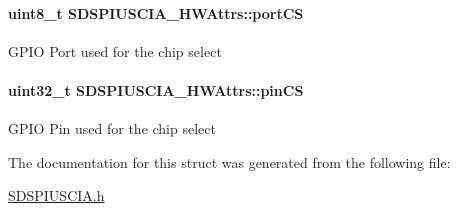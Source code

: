 \paragraph[{port\+C\+S}]{\setlength{\rightskip}{0pt plus 5cm}uint8\+\_\+t S\+D\+S\+P\+I\+U\+S\+C\+I\+A\+\_\+\+H\+W\+Attrs\+::port\+C\+S}\label{struct_s_d_s_p_i_u_s_c_i_a___h_w_attrs_aa10da6b5705fa5bdb6087a7f44374ea1}
G\+P\+I\+O Port used for the chip select 
\paragraph[{pin\+C\+S}]{\setlength{\rightskip}{0pt plus 5cm}uint32\+\_\+t S\+D\+S\+P\+I\+U\+S\+C\+I\+A\+\_\+\+H\+W\+Attrs\+::pin\+C\+S}\label{struct_s_d_s_p_i_u_s_c_i_a___h_w_attrs_a5d7132ccc67a85fa26e3c1af856410c4}
G\+P\+I\+O Pin used for the chip select 

The documentation for this struct was generated from the following file\+:\begin{DoxyCompactItemize}
\item 
\hyperlink{_s_d_s_p_i_u_s_c_i_a_8h}{S\+D\+S\+P\+I\+U\+S\+C\+I\+A.\+h}\end{DoxyCompactItemize}
